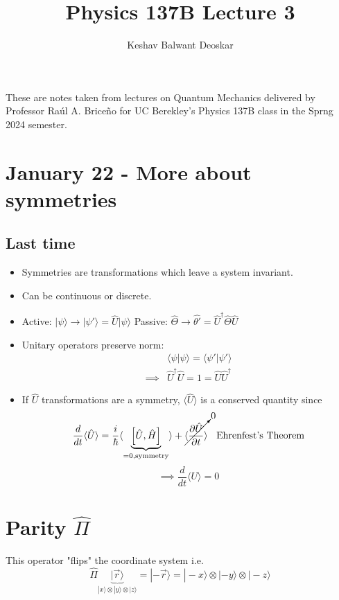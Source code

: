 \documentclass{article}
\title{Physics 137B Lecture 3}
\author{Keshav Balwant Deoskar}
\newcommand{\ket}[1]{|#1 \rangle}
\newcommand{\inner}[2]{\langle #1 | #2 \rangle}
\newcommand{\mean}[1]{\langle #1 \rangle}
\begin{document}
\maketitle

These are notes taken from lectures on Quantum Mechanics delivered by Professor Raúl A. Briceño for UC Berekley's Physics 137B class in the Sprng 2024 semester.

\tableofcontents

\pagebreak

\section{January 22 - More about symmetries}

\subsection{Last time}

\begin{itemize}
  \item Symmetries are transformations which leave a system invariant.
  \item Can be continuous or discrete.
  \item Active: $\ket{\psi} \rightarrow \ket{\psi'} = \hat{U} \ket{\psi}$ 
  Passive: $\hat{\Theta} \rightarrow \hat{\theta'} = \hat{U}^{\dagger} \hat{\Theta} \hat{U}$
  \item Unitary operators preserve norm: 
  \begin{align*}
    &\inner{\psi}{\psi} = \inner{\psi'}{\psi'} \\
    \implies& \hat{U}^{\dagger} \hat{U} = 1 = \hat{U} \hat{U}^{\dagger}
  \end{align*}

  \item If $\hat{U}$ transformations are a symmetry, $\mean{\hat{U}}$ is a conserved quantity since 
  \begin{align*}
    \frac{d}{dt}\mean{\hat{U}} &= \frac{i}{\hbar}\mean{\underbrace{\left[ \hat{U}, \hat{H} \right]}_{=0, \text{symmetry}}} + \cancelto{0}{\mean{\frac{\partial \hat{U}}{\partial t}}} \;\;\text{ Ehrenfest's Theorem} \\
  \end{align*}
  \[ \implies \boxed{ \frac{d}{dt}\mean{U} = 0 } \]
\end{itemize}

\vskip 1cm
\section{Parity $\hat{\Pi}$}
This operator "flips" the coordinate system i.e.
\[ \hat{\Pi} \underbrace{\ket{\vec{r}}}_{\ket{x} \otimes \ket{y} \otimes\ket{z} } = \ket{-\vec{r}} = \ket{-x} \otimes \ket{-y} \otimes\ket{-z}   \]
\end{document}

